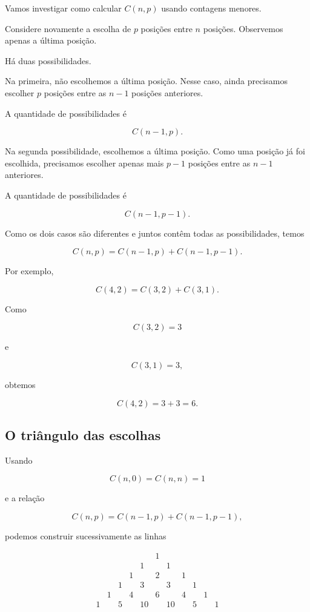 \documentclass[12pt,a4paper]{article}
\begin{document}
Vamos investigar como calcular \(C(n,p)\) usando contagens menores.

Considere novamente a escolha de \(p\) posições entre \(n\) posições.
Observemos apenas a última posição.

Há duas possibilidades.

Na primeira, não escolhemos a última posição. Nesse caso, ainda
precisamos escolher \(p\) posições entre as \(n-1\) posições anteriores.

A quantidade de possibilidades é

\[
C(n-1,p).
\]

Na segunda possibilidade, escolhemos a última posição. Como uma posição
já foi escolhida, precisamos escolher apenas mais \(p-1\) posições entre
as \(n-1\) anteriores.

A quantidade de possibilidades é

\[
C(n-1,p-1).
\]

Como os dois casos são diferentes e juntos contêm todas as
possibilidades, temos

\[
C(n,p)=C(n-1,p)+C(n-1,p-1).
\]

Por exemplo,

\[
C(4,2)=C(3,2)+C(3,1).
\]

Como

\[
C(3,2)=3
\]

e

\[
C(3,1)=3,
\]

obtemos

\[
C(4,2)=3+3=6.
\]

\subsection{O triângulo das escolhas}

Usando

\[
C(n,0)=C(n,n)=1
\]

e a relação

\[
C(n,p)=C(n-1,p)+C(n-1,p-1),
\]

podemos construir sucessivamente as linhas

\[
\begin{array}{ccccccccccc}
 & & & & &1& & & & & \\[4pt]
 & & & &1& &1& & & & \\[4pt]
 & & &1& &2& &1& & & \\[4pt]
 & &1& &3& &3& &1& & \\[4pt]
 &1& &4& &6& &4& &1& \\[4pt]
1& &5& &10& &10& &5& &1
\end{array}
\]
\end{document}
